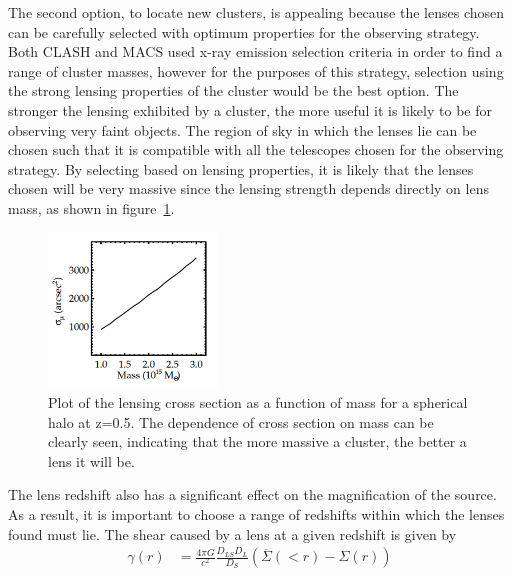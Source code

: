 	The second option, to locate new clusters, is appealing because the lenses chosen can be carefully selected with optimum properties for the observing strategy. Both CLASH and MACS used x-ray emission selection criteria in order to find a range of cluster masses, however for the purposes of this strategy, selection using the strong lensing properties of the cluster would be the best option. The stronger the lensing exhibited by a cluster, the more useful it is likely to be for observing very faint objects. The region of sky in which the lenses lie can be chosen such that it is compatible with all the telescopes chosen for the observing strategy. By selecting based on lensing properties, it is likely that the lenses chosen will be very massive since the lensing strength depends directly on lens mass, as shown in figure~\ref{fig:Lensing_cross_section_as_a_function_of_mass}\cite{Optimal_mass_configurations}.
	\begin{figure}[!htb]
		\centering
			\includegraphics[width=0.4\textwidth]{../Images/Lensing_cross_section_as_a_function_of_mass.png}
		\caption[Lensing cross section as a function of mass]{\cite{Optimal_mass_configurations}Plot of the lensing cross section as a function of mass for a spherical halo at z=0.5. The dependence of cross section on mass can be clearly seen, indicating that the more massive a cluster, the better a lens it will be.\label{fig:Lensing_cross_section_as_a_function_of_mass}}
	\end{figure}

	The lens redshift also has a significant effect on the magnification of the source. As a result, it is important to choose a range of redshifts within which the lenses found must lie. The shear caused by a lens at a given redshift is given by
	\begin{align}
		\gamma(r) &= \frac{4\pi G}{c^2}\frac{D_{LS}D_{L}}{D_S}\left( \overline{\Sigma}(<r)-\Sigma(r) \right)
	\end{align}

